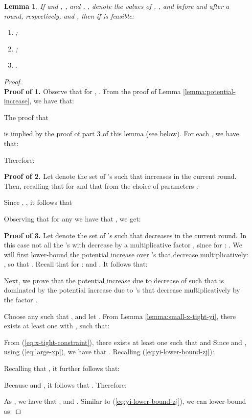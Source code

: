 \documentclass[11pt]{article}
\newtheorem{lemma}[theorem]{Lemma}
\begin{document}
\begin{lemma}\label{lemma:potential-increase-alpha<1}
If  and , ,  and , ,  denote the values of , , and  before and after a round, respectively, and , then if  is feasible:
\begin{enumerate}
\item ;
\item ;
\item .
\end{enumerate}
\end{lemma}
\begin{proof}
\\
\noindent\textbf{Proof of 1.} Observe that for , . From the proof of Lemma \ref{lemma:potential-increase}, we have that: 

The proof that

is implied by the proof of part 3 of this lemma (see below). 
For each , we have that:

Therefore:



\noindent\textbf{Proof of 2.} Let  denote the set of 's such that  increases in the current round. Then, recalling that for   and that from the choice of parameters :

Since , , it follows that 

Observing that for any  we have that , we get:



\noindent\textbf{Proof of 3.} Let  denote the set of 's such that  decreases in the current round. In this case not all the 's with  decrease by a multiplicative factor , since for : . We will first lower-bound the potential increase over 's that decrease multiplicatively: , so that . Recall that for :  and . It follows that:

Next, we prove that the potential increase due to decrease of  such that  is dominated by the potential increase due to 's that decrease multiplicatively by the factor . 

Choose any  such that , and let . From Lemma \ref{lemma:small-x-tight-yi}, there exists at least one  with , such that:


From (\ref{eq:x-tight-constraint}), there exists at least one  such that  and 
Since  and , using (\ref{eq:large-xp}), we have that . Recalling (\ref{eq:yi-lower-bound-zj}):

Recalling that , it further follows that:

Because  and , it follows that . Therefore:


As , we have that , and . Similar to (\ref{eq:yi-lower-bound-zj}), we can lower-bound  as:


\end{proof}
\end{document}
